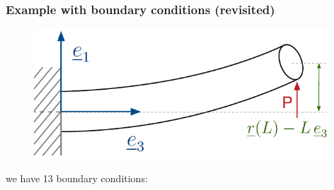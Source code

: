 \begin{frame}
  \frametitle{Example with boundary conditions (revisited)}

  \begin{figure}
    \centering
    \includegraphics[width=11cm, keepaspectratio=true]{sections/cosserat_rods/images/MinimumPotentialEnergyMethodExample}
  \end{figure}
  
  \vspace{0.7em}
  we have 13 boundary conditions:
  

\end{frame}
